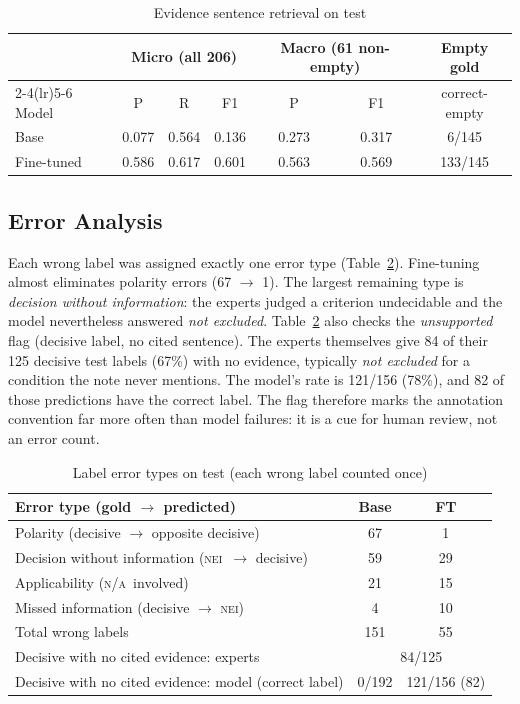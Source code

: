 \documentclass[conference]{IEEEtran}
\newcommand{\NEI}{\textsc{nei}}
\newcommand{\NA}{\textsc{n/a}}
\begin{document}
\begin{table}[t]
\caption{Evidence sentence retrieval on test}
\label{tab:evidence}
\centering
\footnotesize
\setlength{\tabcolsep}{3pt}
\begin{tabular}{lcccccc}
\toprule
 & \multicolumn{3}{c}{Micro (all 206)} & \multicolumn{2}{c}{Macro (61 non-empty)} & Empty gold\\
\cmidrule(lr){2-4}\cmidrule(lr){5-6}
Model & P & R & F1 & P & F1 & correct-empty\\
\midrule
Base & 0.077 & 0.564 & 0.136 & 0.273 & 0.317 & 6/145\\
Fine-tuned & 0.586 & 0.617 & 0.601 & 0.563 & 0.569 & 133/145\\
\bottomrule
\end{tabular}
\end{table}

\subsection{Error Analysis}
Each wrong label was assigned exactly one error type (Table~\ref{tab:errors}). Fine-tuning almost eliminates polarity errors (67 $\rightarrow$ 1). The largest remaining type is \emph{decision without information}: the experts judged a criterion undecidable and the model nevertheless answered \emph{not excluded}. Table~\ref{tab:errors} also checks the \emph{unsupported} flag (decisive label, no cited sentence). The experts themselves give 84 of their 125 decisive test labels (67\%) with no evidence, typically \emph{not excluded} for a condition the note never mentions. The model's rate is 121/156 (78\%), and 82 of those predictions have the correct label. The flag therefore marks the annotation convention far more often than model failures: it is a cue for human review, not an error count.

\begin{table}[t]
\caption{Label error types on test (each wrong label counted once)}
\label{tab:errors}
\centering
\footnotesize
\setlength{\tabcolsep}{3pt}
\begin{tabular}{p{4.6cm}cc}
\toprule
Error type (gold $\rightarrow$ predicted) & Base & FT\\
\midrule
Polarity (decisive $\rightarrow$ opposite decisive) & 67 & 1\\
Decision without information (\NEI\ $\rightarrow$ decisive) & 59 & 29\\
Applicability (\NA\ involved) & 21 & 15\\
Missed information (decisive $\rightarrow$ \NEI) & 4 & 10\\
\midrule
Total wrong labels & 151 & 55\\
\midrule
Decisive with no cited evidence: experts & \multicolumn{2}{c}{84/125}\\
Decisive with no cited evidence: model (correct label) & 0/192 & 121/156 (82)\\
\bottomrule
\end{tabular}
\end{table}
\end{document}
